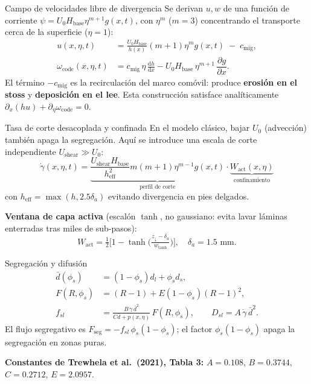 \documentclass[11pt]{beamer}
\newcommand{\dd}{\mathrm{d}}
\newcommand{\pd}[2]{\dfrac{\partial #1}{\partial #2}}
\begin{document}
\begin{frame}{Campo de velocidades libre de divergencia}
Se derivan $u,w$ de una función de corriente $\psi=U_0H_{\mathrm{base}}\eta^{m+1}g(x,t)$, con $\eta^m$ ($m=3$) concentrando el transporte cerca de la superficie ($\eta=1$):
\begin{align*}
    u(x,\eta,t) &= \frac{U_0 H_{\mathrm{base}}}{h(x)}(m+1)\eta^m g(x,t) \;-\; c_{\mathrm{mig}},\\
    \omega_{\mathrm{code}}(x,\eta,t) &= c_{\mathrm{mig}}\,\eta\,\frac{\dd h}{\dd x} - U_0 H_{\mathrm{base}}\,\eta^{m+1}\,\pd{g}{x}.
\end{align*}
El término $-c_{\mathrm{mig}}$ es la recirculación del marco comóvil: produce \textbf{erosión en el stoss} y \textbf{deposición en el lee}. Esta construcción satisface analíticamente $\partial_x(hu)+\partial_\eta\omega_{\mathrm{code}}=0$.
\end{frame}

\begin{frame}{Tasa de corte desacoplada y confinada}
En el modelo clásico, bajar $U_0$ (advección) también apaga la segregación. Aquí se introduce una escala de corte independiente $U_{\mathrm{shear}}\gg U_0$:
\begin{equation*}
    \dot\gamma(x,\eta,t) =
    \underbrace{\frac{U_{\mathrm{shear}}H_{\mathrm{base}}}{h_{\mathrm{eff}}^2}m(m+1)\eta^{m-1}g(x,t)}_{\text{perfil de corte}}
    \cdot \underbrace{W_{\mathrm{act}}(x,\eta)}_{\text{confinamiento}}
\end{equation*}
con $h_{\mathrm{eff}}=\max(h,2.5\delta_a)$ evitando divergencia en pies delgados.

\vspace{4pt}
\textbf{Ventana de capa activa} (escalón $\tanh$, no gaussiano: evita lavar láminas enterradas tras miles de sub-pasos):
\begin{equation*}
    W_{\mathrm{act}} = \tfrac12\Big[1-\tanh\Big(\tfrac{z_\downarrow-\delta_a}{w_{\tanh}}\Big)\Big], \quad \delta_a=1.5\text{ mm}.
\end{equation*}
\end{frame}

\begin{frame}{Segregación y difusión}
\begin{align*}
    \bar d(\phi_s) &= (1-\phi_s)d_l+\phi_s d_s, \\[2pt]
    F(R,\phi_s) &= (R-1)+E(1-\phi_s)(R-1)^2, \\[2pt]
    f_{sl} &= \frac{B\,\dot\gamma\,\bar d^2}{C\bar d+p(x,\eta)}\,F(R,\phi_s), \qquad D_{sl} = A\,\dot\gamma\,\bar d^2 .
\end{align*}
El flujo segregativo es $F_{\mathrm{seg}}=-f_{sl}\,\phi_s(1-\phi_s)$; el factor $\phi_s(1-\phi_s)$ apaga la segregación en zonas puras.

\vspace{4pt}
{\small\textbf{Constantes de Trewhela et al.\ (2021), Tabla 3:} $A=0.108$, $B=0.3744$, $C=0.2712$, $E=2.0957$.\par}
\end{frame}
\end{document}
